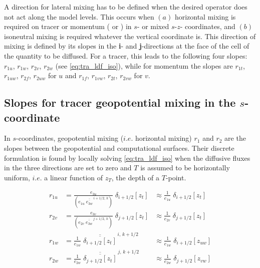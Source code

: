 \documentclass[../main/NEMO_manual]{subfiles}
\begin{document}
A direction for lateral mixing has to be defined when the desired operator does not act along the model levels.
This occurs when $(a)$ horizontal mixing is required on tracer or momentum
( or ) in $s$- or mixed $s$-$z$- coordinates,
and $(b)$ isoneutral mixing is required whatever the vertical coordinate is.
This direction of mixing is defined by its slopes in the \textbf{i}- and \textbf{j}-directions at the face of
the cell of the quantity to be diffused.
For a tracer, this leads to the following four slopes:
$r_{1u}$, $r_{1w}$, $r_{2v}$, $r_{2w}$ (see \autoref{eq:tra_ldf_iso}),
while for momentum the slopes are  $r_{1t}$, $r_{1uw}$, $r_{2f}$, $r_{2uw}$ for $u$ and
$r_{1f}$, $r_{1vw}$, $r_{2t}$, $r_{2vw}$ for $v$. 


\subsection{Slopes for tracer geopotential mixing in the $s$-coordinate}

In $s$-coordinates, geopotential mixing ($i.e.$ horizontal mixing) $r_1$ and $r_2$ are the slopes between
the geopotential and computational surfaces.
Their discrete formulation is found by locally solving \autoref{eq:tra_ldf_iso} when
the diffusive fluxes in the three directions are set to zero and $T$ is assumed to be horizontally uniform,
$i.e.$ a linear function of $z_T$, the depth of a $T$-point. 

\begin{equation}
  \label{eq:ldfslp_geo}
  \begin{aligned}
    r_{1u} &= \frac{e_{3u}}{ \left( e_{1u}\;\overline{\overline{e_{3w}}}^{\,i+1/2,\,k} \right)}
    \;\delta_{i+1/2}[z_t]
    &\approx \frac{1}{e_{1u}}\; \delta_{i+1/2}[z_t] \ \ \ \\
    r_{2v} &= \frac{e_{3v}}{\left( e_{2v}\;\overline{\overline{e_{3w}}}^{\,j+1/2,\,k} \right)}
    \;\delta_{j+1/2} [z_t]
    &\approx \frac{1}{e_{2v}}\; \delta_{j+1/2}[z_t] \ \ \ \\
    r_{1w} &= \frac{1}{e_{1w}}\;\overline{\overline{\delta_{i+1/2}[z_t]}}^{\,i,\,k+1/2}
    &\approx \frac{1}{e_{1w}}\; \delta_{i+1/2}[z_{uw}]  \\
    r_{2w} &= \frac{1}{e_{2w}}\;\overline{\overline{\delta_{j+1/2}[z_t]}}^{\,j,\,k+1/2}
    &\approx \frac{1}{e_{2w}}\; \delta_{j+1/2}[z_{vw}]
  \end{aligned}
\end{equation}
\end{document}
